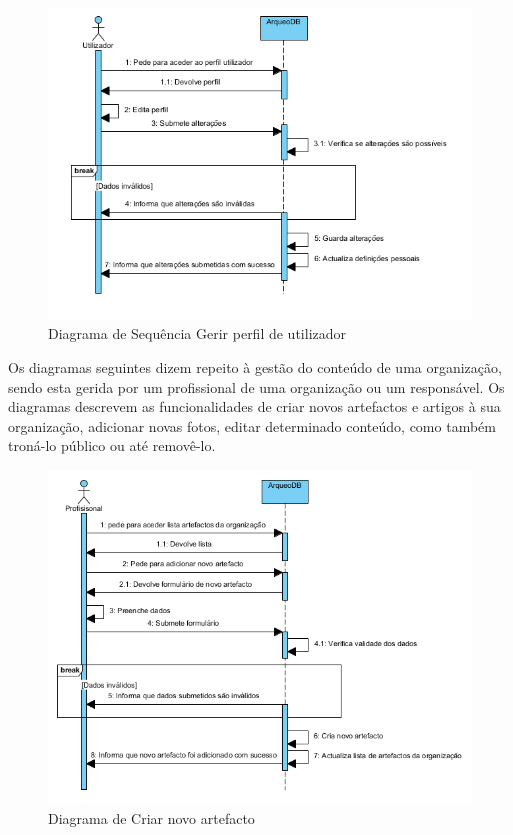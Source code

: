 ﻿\documentclass[12pt,a4paper]{article}
\begin{document}
\begin{figure}[h!]
\centering
\includegraphics[scale=1]{sequencia/gerirperfil}
\caption{Diagrama de Sequência Gerir perfil de utilizador} 
\end{figure}


\clearpage
Os diagramas seguintes dizem repeito à gestão do conteúdo de uma organização, sendo esta gerida por um profissional de uma organização ou um responsável. Os diagramas descrevem as funcionalidades de criar novos artefactos e artigos à sua organização, adicionar novas fotos, editar determinado conteúdo, como também troná-lo público ou até removê-lo.\\

\begin{figure}[h!]
\centering
\includegraphics[scale=1]{sequencia/criarartefacto}
\caption{Diagrama de Criar novo artefacto} 
\end{figure}
\end{document}
